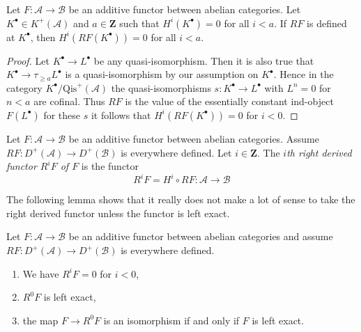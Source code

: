 \begin{lemma}
\label{lemma-negative-vanishing}
Let $F : \mathcal{A} \to \mathcal{B}$ be an additive functor
between abelian categories. Let $K^\bullet \in K^{+}(\mathcal{A})$
and $a \in \mathbf{Z}$ such that $H^i(K^\bullet) = 0$ for all
$i < a$. If $RF$ is defined at $K^\bullet$, then
$H^i(RF(K^\bullet)) = 0$ for all $i < a$.
\end{lemma}

\begin{proof}
Let $K^\bullet \to L^\bullet$ be any quasi-isomorphism.
Then it is also true that $K^\bullet \to \tau_{\geq a}L^\bullet$
is a quasi-isomorphism by our assumption on $K^\bullet$.
Hence in the category $K^\bullet/\text{Qis}^{+}(\mathcal{A})$ the
quasi-isomorphisms $s : K^\bullet \to L^\bullet$ with $L^n = 0$ for $n < a$
are cofinal. Thus $RF$ is the value of the essentially constant
ind-object $F(L^\bullet)$ for these $s$ it follows that
$H^i(RF(K^\bullet)) = 0$ for $i < 0$.
\end{proof}

\begin{definition}
\label{definition-higher-derived-functors}
Let $F : \mathcal{A} \to \mathcal{B}$ be an additive functor
between abelian categories. Assume
$RF : D^{+}(\mathcal{A}) \to D^{+}(\mathcal{B})$ is everywhere
defined. Let $i \in \mathbf{Z}$.
The {\it $i$th right derived functor $R^iF$ of $F$} is the functor
$$
R^iF = H^i \circ RF :
\mathcal{A}
\longrightarrow
\mathcal{B}
$$
\end{definition}

\noindent
The following lemma shows that it really does not make a lot
of sense to take the right derived functor unless the functor
is left exact.

\begin{lemma}
\label{lemma-left-exact-higher-derived}
Let $F : \mathcal{A} \to \mathcal{B}$ be an additive functor
between abelian categories and assume
$RF : D^{+}(\mathcal{A}) \to D^{+}(\mathcal{B})$ is everywhere
defined.
\begin{enumerate}
\item We have $R^iF = 0$ for $i < 0$,
\item $R^0F$ is left exact,
\item the map $F \to R^0F$ is an isomorphism if and
only if $F$ is left exact.
\end{enumerate}
\end{lemma}

